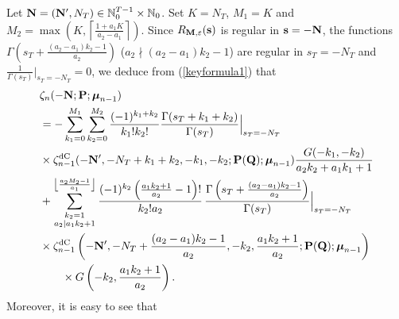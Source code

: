 \documentclass[a4paper,12pt]{article}
\theoremstyle{definition}
\numberwithin{equation}{section}
\def\N{{\mathbb N}}
\def\s{{\bf s}}
\def\Nb{{\bf N}}
\def\P{{\bf P}}
\def\M{{\bf M}}
\newcommand{\mub}{\boldsymbol{\mu}}
\newcommand{\dc}{\mathrm{dC}}
\def\eps{{\varepsilon}}
\let\ds=\displaystyle
\begin{document}
Let $\Nb=(\Nb', N_T)\in \N_0^{T-1}\times \N_0$.
 Set $K=N_T$, $M_1 = K$ and $M_2= \max \left(K, \left\lceil\frac{1+a_1 K}{a_2-a_1}\right\rceil\right)$.
Since $ R _{\M, {\mathbf{\eps}}} (\s)$ is regular in $\s=-\Nb$, the functions  $\ds \Gamma \left(s_T+\frac{(a_2-a_1)k_2-1}{a_2}\right) $ ($a_2 \nmid (a_2-a_1)k_2-1$) are regular in $s_T=-N_T$ and $\displaystyle \frac{1}{\Gamma (s_T)}\Big|_{s_T=-N_T}=0$,
we deduce from (\ref{keyformula1}) that
\begin{align}\label{keyformula2}
&\zeta_n(-\Nb;\P;\mub_{n-1})\notag\\
&=-\sum_{k_1=0}^{M_1}\sum_{k_2=0}^{M_2}\frac{(-1)^{k_1+k_2}}{k_1! k_2!}
\frac{\Gamma (s_T+k_1+k_2)}{\Gamma (s_T)}\Big|_{s_T=-N_T} \notag \\
& \times\zeta_{n-1}^{\dc}(-\Nb', -N_T+k_1+k_2, -k_1, -k_2; \mathbf{P(Q)};\boldsymbol{\mu}_{n-1})\frac{G(-k_1, -k_2)}{a_2k_2+a_1k_1+1}\notag\\
 & + \sum_{\substack{k_2=1 \\ a_2 \mid a_1 k_2+1}}^{\left\lfloor\frac{a_2 M_2-1}{a_1}\right\rfloor}\frac{(-1)^{k_2}
\left(\frac{a_1 k_2+1}{a_2}-1\right)!}{k_2! a_2} \,
\frac{\Gamma \left(s_T+\frac{(a_2-a_1)k_2-1}{a_2}\right)}{\Gamma (s_T)}\Big|_{s_T=-N_T} \notag 
\\
&\times \zeta_{n-1}^{\dc}\left(-\Nb', -N_T+\frac{(a_2-a_1)k_2-1}{a_2}, - k_2, \frac{a_1k_2+1}{a_2}; \mathbf{P(Q)};\boldsymbol{\mu}_{n-1}\right)\notag\\
&\qquad \times G\left(- k_2, \frac{a_1 k_2+1}{a_2}\right).
\end{align}
Moreover, it is easy to see that
\end{document}
